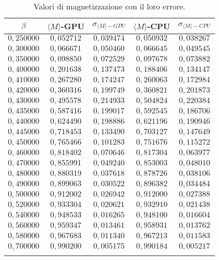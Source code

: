 \documentclass[a4paper,12pt]{article}
\begin{document}
\begin{table}
\begin{center}
\begin {tabular}{c|c|c|c|c}
\hline
\hline
$\beta$ & $\langle  M \rangle$-GPU & $\sigma_{\langle  M \rangle-GPU}$ & $\langle  M \rangle$-CPU & $\sigma_{\langle  M \rangle-CPU}$        \\
\hline
$0,250000$ &    $0,052712$   &     $0,039474$ &  $0,050932$  &  $0,038267$\\
$0,300000$ &     $0,066671$     &   $0,050460$ &  $0,066645$  &  $0,049545$\\
$0,350000$ &      $0,098850$    &    $0,072529$ &  $0,097678$  &  $0,073882$\\
$0,400000$ &      $0,201638$   &     $0,137473$  &  $0,188406$  &  $0,134147$\\
$0,410000$ &       $0,267280$   &     $0,174247$  &  $0,260063$  &  $0,172984$\\
$0,420000$ &       $0,360316$   &     $0,199749$  &  $0,360821$  &  $0,201873$\\
$0,430000$ &       $0,495578$   &     $0,214933$  &  $0,504824$  &  $0,220384$\\
$0,435000$ &       $0,587416$   &     $0,199017$  &  $0,592545$  &  $0,186706$\\
$0,440000$ &       $0,624490$   &     $0,198886$  &  $0,621196$  &  $0,190946$\\
$0,445000$ &       $0,718453$   &     $0,133490$  &  $0,703127$  &  $0,147649$\\
$0,450000$ &       $0,765466$   &     $0,101283$  &  $0,751676$  &  $0,115272$\\
$0,460000$ &       $0,818402$   &     $0,070646$  &  $0,817304$  &  $0,063977$\\
$0,470000$ &       $0,855991$   &     $0,049240$  &  $0,853003$  &  $0,048010$\\
$0,480000$ &       $0,880319$   &     $0,037618$  &  $0,878726$  &  $0,038106$\\
$0,490000$ &       $0,899063$   &     $0,030522$  &  $0,896382$  &  $0,034484$\\
$0,500000$ &       $0,912002$   &     $0,026942$  &  $0,912000$  &  $0,027388$\\
$0,520000$ &       $0,933304$   &     $0,020621$  &  $0,932910$  &  $0,021438$\\
$0,540000$ &       $0,948533$   &     $0,016265$  &  $0,948100$  &  $0,016604$\\
$0,560000$ &       $0,959347$   &     $0,013461$  &  $0,958931$  &  $0,013762$\\
$0,580000$ &       $0,967683$   &     $0,011340$  &  $0,967213$  &  $0,011583$\\
$0,700000$ &       $0,990200$   &     $0,005175$  &  $0,990184$  &  $0,005217$\\
\\
\hline
\hline
\end{tabular}
\end{center}
\caption{\label{tab:mag}
	Valori di magnetizzazione con il loro errore.
}
\end{table}
\end{document}
